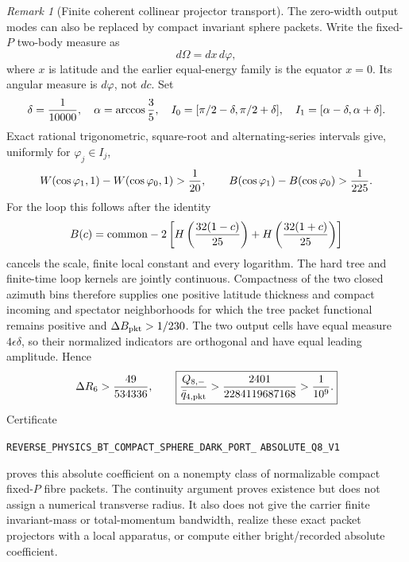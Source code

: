 \documentclass[11pt]{article}
\theoremstyle{definition}
\theoremstyle{remark}
\newtheorem{remark}[theorem]{Remark}
\begin{document}
\begin{remark}[Finite coherent collinear projector transport]
The zero-width output modes can also be replaced by compact invariant sphere
packets.  Write the fixed-$P$ two-body measure as
\[
 d\Omega=dx\,d\varphi,
\]
where $x$ is latitude and the earlier equal-energy family is the equator
$x=0$.  Its angular measure is $d\varphi$, not $dc$.  Set
\[
 \delta={1\over10000},\quad \alpha=\arccos{3\over5},\quad
 I_0=[\pi/2-\delta,\pi/2+\delta],\quad
 I_1=[\alpha-\delta,\alpha+\delta].
\]
Exact rational trigonometric, square-root and alternating-series intervals
give, uniformly for $\varphi_j\in I_j$,
\[
 W(\cos\varphi_1,1)-W(\cos\varphi_0,1)>{1\over20},
 \qquad
 B(\cos\varphi_1)-B(\cos\varphi_0)>{1\over225}.
\]
For the loop this follows after the identity
\[
 B(c)=\text{common}-2\left[H\left({32(1-c)\over25}\right)
 +H\left({32(1+c)\over25}\right)\right]
\]
cancels the scale, finite local constant and every logarithm.  The hard tree
and finite-time loop kernels are jointly continuous.  Compactness of the two
closed azimuth bins therefore supplies one positive latitude thickness and
compact incoming and spectator neighborhoods for which the tree packet
functional remains positive and $\Delta B_{\rm pkt}>1/230$.  The two output
cells have equal measure $4\epsilon\delta$, so their normalized indicators are
orthogonal and have equal leading amplitude.  Hence
\[
 \Delta R_6>{49\over534336},\qquad
 \boxed{{Q_{8,-}\over\bar q_{4,\rm pkt}}
 >{2401\over2284119687168}>{1\over10^9}.}
\]
Certificate
\par\noindent
\texttt{REVERSE\_PHYSICS\_BT\_COMPACT\_SPHERE\_DARK\_PORT\_}
\allowbreak\texttt{ABSOLUTE\_Q8\_V1}
\par\noindent
proves this absolute coefficient on a nonempty class of normalizable compact
fixed-$P$ fibre packets.  The continuity argument proves existence but does
not assign a numerical transverse radius.  It also does not give the carrier
finite invariant-mass or total-momentum bandwidth, realize these exact packet
projectors with a local apparatus, or compute either bright/recorded absolute
coefficient.


\end{remark}
\end{document}
